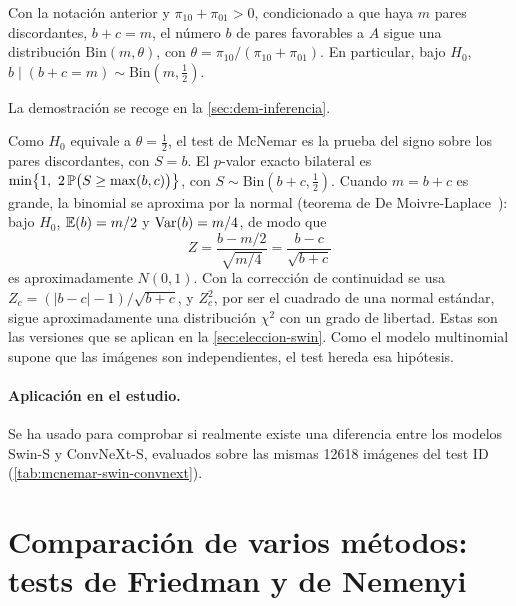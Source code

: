 \begin{proposicion}\label{prop:mcnemar}
Con la notación anterior y $\pi_{10} + \pi_{01} > 0$, condicionado a que haya $m$ pares discordantes, $b + c = m$, el número $b$ de pares favorables a $A$ sigue una distribución $\mathrm{Bin}(m, \theta)$, con $\theta = \pi_{10}/(\pi_{10} + \pi_{01})$. En particular, bajo $H_0$, $b \mid (b + c = m) \sim \mathrm{Bin}(m, \tfrac12)$.
\end{proposicion}
La demostración se recoge en la \cref{sec:dem-inferencia}.

Como $H_0$ equivale a $\theta = \tfrac12$, el test de McNemar es la prueba del signo sobre los pares discordantes, con $S = b$. El $p$-valor exacto bilateral es $\min\bigl\{1,\ 2\,\Prob\bigl(S \ge \max(b, c)\bigr)\bigr\}$, con $S \sim \mathrm{Bin}(b + c, \tfrac12)$. Cuando $m = b + c$ es grande, la binomial se aproxima por la normal (teorema de De Moivre-Laplace~\cite{canavos2003}): bajo $H_0$, $\operatorname{\mathbb{E}}(b) = m/2$ y $\operatorname{Var}(b) = m/4$, de modo que
\[
  Z = \frac{b - m/2}{\sqrt{m/4}} = \frac{b - c}{\sqrt{b + c}}
\]
es aproximadamente $N(0, 1)$. Con la corrección de continuidad se usa $Z_c = (|b - c| - 1)/\sqrt{b + c}$, y $Z_c^2$, por ser el cuadrado de una normal estándar, sigue aproximadamente una distribución $\chi^2$ con un grado de libertad. Estas son las versiones que se aplican en la \cref{sec:eleccion-swin}. Como el modelo multinomial supone que las imágenes son independientes, el test hereda esa hipótesis.

\paragraph{Aplicación en el estudio.} Se ha usado para comprobar si realmente existe una diferencia entre los modelos Swin-S y ConvNeXt-S, evaluados sobre las mismas \num{12618} imágenes del test ID (\cref{tab:mcnemar-swin-convnext}).

\section{Comparación de varios métodos: tests de Friedman y de Nemenyi}\label{sec:friedman-nemenyi}


